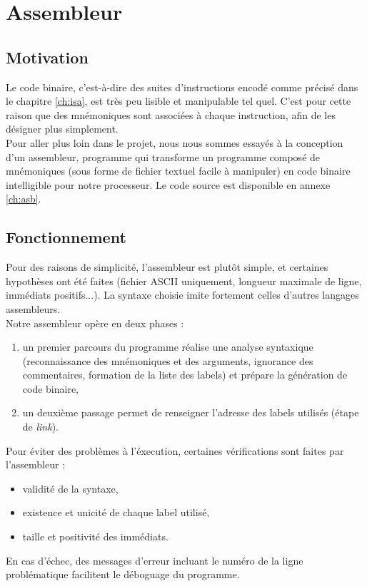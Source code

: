 \chapter{Assembleur}
\label{ch:assembleur}

\section{Motivation}

Le code binaire, c'est-à-dire des suites d'instructions encodé comme précisé
dans le chapitre \ref{ch:isa}, est très peu lisible et manipulable tel quel.
C'est pour cette raison que des mnémoniques sont associées à chaque instruction,
afin de les désigner plus simplement. \\

Pour aller plus loin dans le projet, nous nous sommes essayés à la conception
d'un assembleur, programme qui transforme un programme composé de mnémoniques
(sous forme de fichier textuel facile à manipuler) en code binaire
intelligible pour notre processeur. Le code source est disponible en annexe
\ref{ch:asb}.

\section{Fonctionnement}

Pour des raisons de simplicité, l'assembleur est plutôt simple, et certaines
hypothèses ont été faites (fichier ASCII uniquement, longueur maximale de
ligne, immédiats positifs...). La syntaxe choisie imite fortement celles
d'autres langages assembleurs. \\

Notre assembleur opère en deux phases :
\begin{enumerate}
\item un premier parcours du programme réalise une analyse syntaxique
    (reconnaissance des mnémoniques et des arguments, ignorance des
    commentaires, formation de la liste des labels) et prépare la génération de
    code binaire,
\item un deuxième passage permet de renseigner l'adresse des labels utilisés
    (étape de \textit{link}). \\
\end{enumerate}

Pour éviter des problèmes à l'éxecution, certaines vérifications sont faites
par l'assembleur :
\begin{itemize}
\item validité de la syntaxe,
\item existence et unicité de chaque label utilisé,
\item taille et positivité des immédiats.
\end{itemize}
En cas d'échec, des messages d'erreur incluant le numéro de la ligne
problématique facilitent le déboguage du programme.

